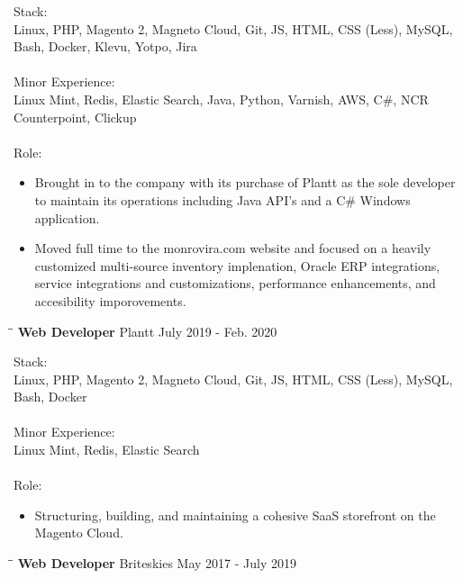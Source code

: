 \documentclass{res}
\begin{document}
\begin{resume}
    Stack: \\
	Linux, PHP, Magento 2, Magneto Cloud, Git, JS, HTML, CSS (Less), MySQL, Bash, Docker, Klevu, Yotpo, Jira \\
	\\
	Minor Experience: \\
	Linux Mint, Redis, Elastic Search, Java, Python, Varnish, AWS, C\#, NCR Counterpoint, Clickup \\
	\\
	Role: \\
	\vspace{-0.15in}	
	\begin{itemize}
		\item Brought in to the company with its purchase of Plantt as the sole developer to maintain its operations including Java API's and a C\# Windows application.
		\item Moved full time to the monrovira.com website and focused on a heavily customized multi-source inventory implenation, Oracle ERP integrations, service integrations and customizations, performance enhancements, and accesibility imporovements.
	\end{itemize}

   \begin{tabbing}
   		\hspace{2.0in}\= \hspace{2.7in}\= \kill %
    	\textbf{Web Developer} \>Plantt \>July 2019 - Feb. 2020\\
   \end{tabbing}\vspace{-20pt}      %
   
    Stack: \\
	Linux, PHP, Magento 2, Magneto Cloud, Git, JS, HTML, CSS (Less), MySQL, Bash, Docker \\
	\\
	Minor Experience: \\
	Linux Mint, Redis, Elastic Search \\
	\\
	Role: \\
	\vspace{-0.15in}	
	\begin{itemize}
		\item Structuring, building, and maintaining a cohesive SaaS storefront on the Magento Cloud.
	\end{itemize}
   
   \begin{tabbing}
   		\hspace{2.0in}\= \hspace{2.7in}\= \kill %
    	\textbf{Web Developer} \>Briteskies     \>May 2017 - July 2019\\
   \end{tabbing}\vspace{-20pt}      %
   

\end{resume}
\end{document}
